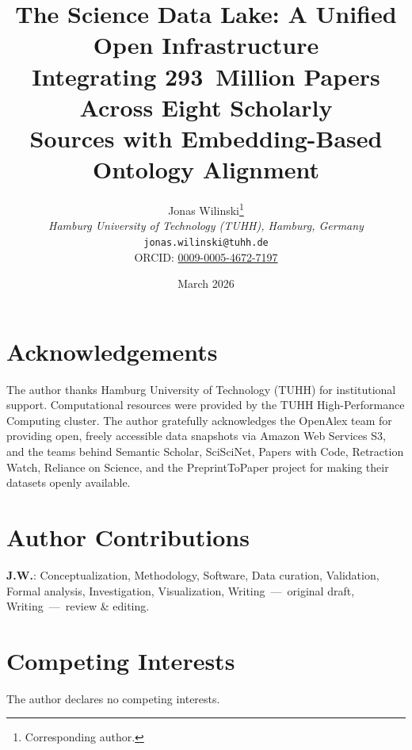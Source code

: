 \documentclass[11pt,a4paper]{article}
\title{The Science Data Lake: A Unified Open Infrastructure\\ Integrating 293~Million Papers Across Eight Scholarly\\ Sources with Embedding-Based Ontology Alignment}
\author{
  Jonas Wilinski\thanks{Corresponding author.}\\
  \textit{Hamburg University of Technology (TUHH), Hamburg, Germany}\\
  \texttt{jonas.wilinski@tuhh.de}\\
  \small ORCID: \href{https://orcid.org/0009-0005-4672-7197}{0009-0005-4672-7197}
}
\date{March 2026}
\begin{document}
\maketitle














\section*{Acknowledgements}
The author thanks Hamburg University of Technology (TUHH) for institutional
support. Computational resources were provided by the TUHH High-Performance
Computing cluster. The author gratefully acknowledges the OpenAlex team for
providing open, freely accessible data snapshots via Amazon Web Services S3,
and the teams behind Semantic Scholar, SciSciNet, Papers with Code,
Retraction Watch, Reliance on Science, and the PreprintToPaper project for
making their datasets openly available.

\section*{Author Contributions}
\textbf{J.W.}: Conceptualization, Methodology, Software, Data curation,
Validation, Formal analysis, Investigation, Visualization,
Writing~---~original draft, Writing~---~review \& editing.

\section*{Competing Interests}
The author declares no competing interests.



\end{document}
